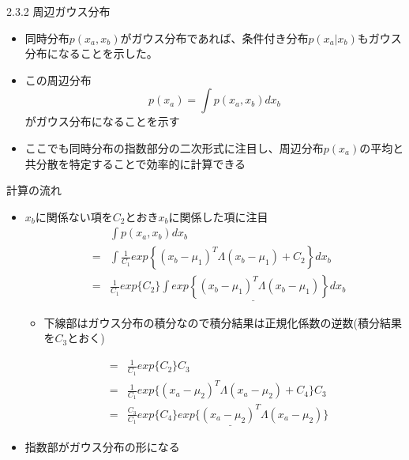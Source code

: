 \begin{frame}{2.3.2 周辺ガウス分布}
 \begin{itemize}
  \item 同時分布$p(x_a,x_b)$がガウス分布であれば、条件付き分布$p(x_a|x_b)$もガウス分布になることを示した。
  \item この周辺分布
        \begin{equation}
         p(x_a) = \int p(x_a,x_b)dx_b
        \end{equation}
        がガウス分布になることを示す
  \item ここでも同時分布の指数部分の二次形式に注目し、周辺分布$p(x_a)$の平均と共分散を特定することで効率的に計算できる
 \end{itemize}
\end{frame}


\begin{frame}{計算の流れ}
 \begin{itemize}
  \item $x_b$に関係ない項を$C_2$とおき$x_b$に関係した項に注目
        \begin{eqnarray*}
         && \int p(x_a,x_b)dx_b \\
         &=& \int \frac{1}{C_1}exp\left\{(x_b-\mu_1)^T\Lambda(x_b-\mu_1)+C_2\right\}dx_b \\
         &=& \frac{1}{C_1}exp\{C_2\}\underline{\int exp\left\{(x_b-\mu_1)^T\Lambda(x_b-\mu_1)\right\}dx_b}
        \end{eqnarray*}
        \begin{itemize}
         \item 下線部はガウス分布の積分なので積分結果は正規化係数の逆数(積分結果を$C_3$とおく)
        \end{itemize}
        \begin{eqnarray*}
         &=&\frac{1}{C_1}exp\{C_2\}C_3 \\
         &=&\frac{1}{C_1}exp\{(x_a-\mu_2)^T\Lambda (x_a-\mu_2)+C_4\}C_3\\
         &=&\frac{C_3}{C_1}\underline{exp\{C_4\}exp\{(x_a-\mu_2)^T\Lambda (x_a-\mu_2)}\}
        \end{eqnarray*}
  \item 指数部がガウス分布の形になる
 \end{itemize}
\end{frame}


